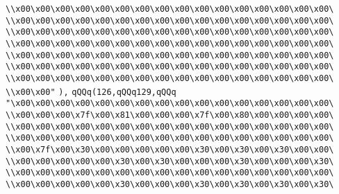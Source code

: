 \verb|\\x00\x00\x00\x00\x00\x00\x00\x00\x00\x00\x00\x00\x00\x00\x00\x00\|\newline
\verb|\\x00\x00\x00\x00\x00\x00\x00\x00\x00\x00\x00\x00\x00\x00\x00\x00\|\newline
\verb|\\x00\x00\x00\x00\x00\x00\x00\x00\x00\x00\x00\x00\x00\x00\x00\x00\|\newline
\verb|\\x00\x00\x00\x00\x00\x00\x00\x00\x00\x00\x00\x00\x00\x00\x00\x00\|\newline
\verb|\\x00\x00\x00\x00\x00\x00\x00\x00\x00\x00\x00\x00\x00\x00\x00\x00\|\newline
\verb|\\x00\x00\x00\x00\x00\x00\x00\x00\x00\x00\x00\x00\x00\x00\x00\x00\|\newline
\verb|\\x00\x00\x00\x00\x00\x00\x00\x00\x00\x00\x00\x00\x00\x00\x00\x00\|\newline
\verb|\\x00\x00"|\newline
\verb|),|\newline
\verb|qQQq(126,qQQq129,qQQq|\newline
\verb|"\x00\x00\x00\x00\x00\x00\x00\x00\x00\x00\x00\x00\x00\x00\x00\x00\|\newline
\verb|\\x00\x00\x00\x7f\x00\x81\x00\x00\x00\x7f\x00\x80\x00\x00\x00\x00\|\newline
\verb|\\x00\x00\x00\x00\x00\x00\x00\x00\x00\x00\x00\x00\x00\x00\x00\x00\|\newline
\verb|\\x00\x00\x00\x00\x00\x00\x00\x00\x00\x00\x00\x00\x00\x00\x00\x00\|\newline
\verb|\\x00\x7f\x00\x30\x00\x00\x00\x00\x00\x30\x00\x30\x00\x30\x00\x00\|\newline
\verb|\\x00\x00\x00\x00\x00\x30\x00\x30\x00\x00\x00\x30\x00\x00\x00\x30\|\newline
\verb|\\x00\x00\x00\x00\x00\x00\x00\x00\x00\x00\x00\x00\x00\x00\x00\x00\|\newline
\verb|\\x00\x00\x00\x00\x00\x30\x00\x00\x00\x30\x00\x30\x00\x30\x00\x30\|\newline
